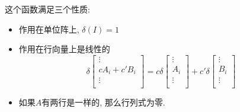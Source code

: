 这个函数满足三个性质:
\begin{itemize}
    \item 作用在单位阵上, $\delta(I) = 1$
    \item 作用在行向量上是线性的
    \begin{equation}
      \delta \begin{bmatrix}
       \vdots\\
       c A_i + c' B_i\\
       \vdots\\
      \end{bmatrix}
      =
      c \delta 
      \begin{bmatrix}
       \vdots\\
       A_i\\
       \vdots\\
      \end{bmatrix}
      +
      c'\delta
      \begin{bmatrix}
       \vdots\\
       B_i\\
       \vdots\\
      \end{bmatrix}
    \end{equation}

    \item 如果$A$有两行是一样的, 那么行列式为零.
\end{itemize}


